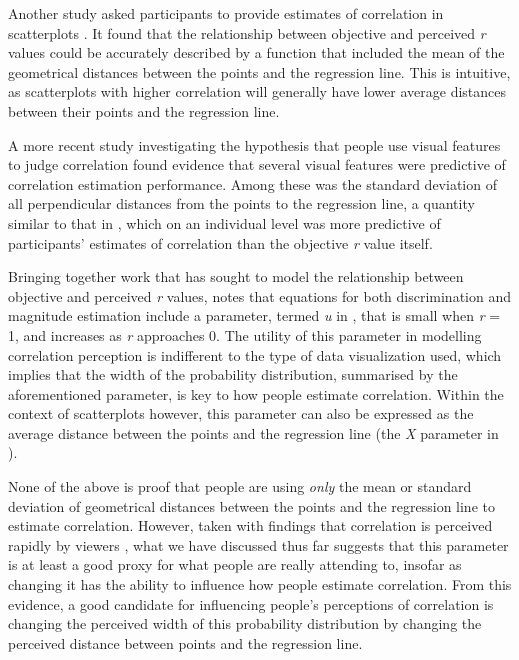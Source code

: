 \documentclass[preprint, 3p,
authoryear]{elsarticle} %
\begin{document}
Another study asked participants to provide estimates of correlation in
scatterplots \citep{meyer_1997}. It found that the relationship between
objective and perceived \emph{r} values could be accurately described by
a function that included the mean of the geometrical distances between
the points and the regression line. This is intuitive, as scatterplots
with higher correlation will generally have lower average distances
between their points and the regression line.

A more recent study investigating the hypothesis that people use visual
features to judge correlation \citep{yang_2019} found evidence that
several visual features were predictive of correlation estimation
performance. Among these was the standard deviation of all perpendicular
distances from the points to the regression line, a quantity similar to
that in \citet{meyer_1997}, which on an individual level was more
predictive of participants' estimates of correlation than the objective
\emph{r} value itself.

Bringing together work that has sought to model the relationship between
objective and perceived \emph{r} values, \citet{rensink_2017} notes that
equations for both discrimination and magnitude estimation include a
parameter, termed \emph{u} in \citet{rensink_2017}, that is small when
\emph{r} = 1, and increases as \emph{r} approaches 0. The utility of
this parameter in modelling correlation perception is indifferent to the
type of data visualization used, which implies that the width of the
probability distribution, summarised by the aforementioned parameter, is
key to how people estimate correlation. Within the context of
scatterplots however, this parameter can also be expressed as the
average distance between the points and the regression line (the
\emph{X} parameter in \citealp{meyer_1997}).

None of the above is proof that people are using \emph{only} the mean or
standard deviation of geometrical distances between the points and the
regression line to estimate correlation. However, taken with findings
that correlation is perceived rapidly by viewers \citep{rensink_2014},
what we have discussed thus far suggests that this parameter is at least
a good proxy for what people are really attending to, insofar as
changing it has the ability to influence how people estimate
correlation. From this evidence, a good candidate for influencing
people's perceptions of correlation is changing the perceived width of
this probability distribution by changing the perceived distance between
points and the regression line.
\end{document}

